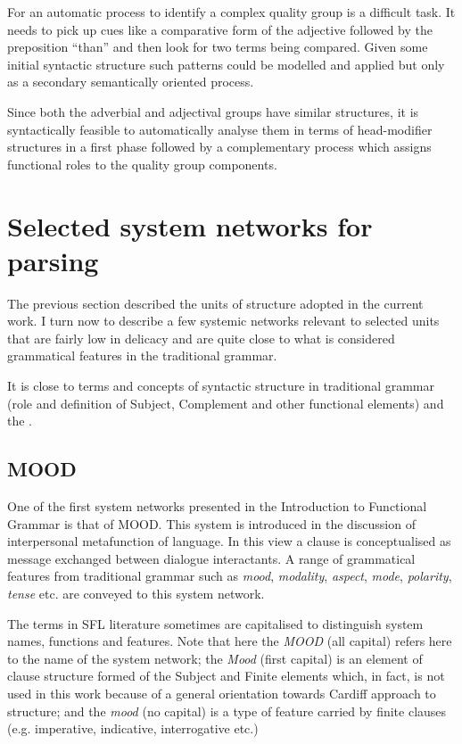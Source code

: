 	For an automatic process to identify a complex quality group is a difficult task. It needs to pick up cues like a comparative form of the adjective followed by the preposition ``than'' and then look for two terms being compared. Given some initial syntactic structure such patterns could be modelled and applied but only as a secondary semantically oriented process.
	
	Since both the adverbial and adjectival groups have similar structures, it is syntactically feasible to automatically analyse them in terms of head-modifier structures in a first phase followed by a complementary process which assigns functional roles to the quality group components.

\section{Selected system networks for parsing}
    The previous section described the units of structure adopted in the current work. I turn now to describe a few systemic networks relevant to selected units that are fairly low in delicacy and are quite close to what is considered grammatical features in the traditional grammar. 

    
    It is close to terms and concepts of syntactic structure in traditional grammar (role and definition of Subject, Complement and other functional elements) and the . 
    
\subsection{MOOD}
\label{sec:mood}

    One of the first system networks presented in the Introduction to Functional Grammar \citep{Halliday2013} is that of MOOD. 
    This system is introduced in the discussion of interpersonal metafunction of language. In this view a clause is conceptualised as message exchanged between dialogue interactants. A range of grammatical features from traditional grammar such as \textit{mood}, \textit{modality}, \textit{aspect}, \textit{mode}, \textit{polarity}, \textit{tense} etc. are conveyed to this system network. 
    
    The terms in SFL literature sometimes are capitalised to distinguish system names, functions and features. Note that here the \textit{MOOD} (all capital) refers here to the name of the system network; the \textit{Mood} (first capital) is an element of clause structure formed of the Subject and Finite elements which, in fact, is not used in this work because of a general orientation towards Cardiff approach to structure; and the \textit{mood} (no capital) is a type of feature carried by finite clauses (e.g. imperative, indicative, interrogative etc.)

